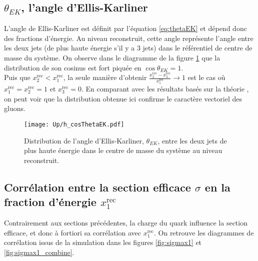 \documentclass[a4paper]{article} %
\numberwithin{equation}{section} %
\theoremstyle{definition}
\theoremstyle{remark}
\theoremstyle{plain}%
\theoremstyle{style_exemple}
\newcommand{\com}[1]{\textcolor{Gray}{(#1)}} %
\begin{document}
\subsection{$\theta_{EK}$, l'angle d'Ellis-Karliner}\label{sec:theta_EK}%

L'angle de Ellis-Karliner est définit par l'équation \eqref{eq:thetaEK} et dépend donc des fractions d'énergie. Au niveau reconstruit, cette angle représente l'angle entre les deux jets (de plus haute énergie s'il y a 3 jets) dans le référentiel de centre de masse du système. On observe dans le diagramme de la figure \ref{fig:thetaEK} que la distribution de son cosinus est fort piquée en $\cos\theta_{EK} = 1$.\\
Puis que $x_2^\text{rec} < x_1^\text{rec} $, la seule manière d'obtenir $\frac{x^\text{rec}_2 - x^\text{rec}_3}{x^\text{rec}_1} \rightarrow 1$ est le cas où $x_1^\text{rec} = x_2^\text{rec} = 1$ et $x_3^\text{rec} = 0$. %
En comparant avec les résultats basés sur la théorie \cite{Cours-QCD}%
, on peut voir que la distribution obtenue ici confirme le caractère vectoriel des gluons.

\begin{figure}[H]
    \centering
    \texttt{[image: Up/h\_cosThetaEK.pdf]}
    \begin{minipage}{12cm}
        \caption{Distribution de l'angle d'Ellis-Karliner, $\theta_{EK}$, entre les deux jets de plus haute énergie dans le centre de masse du système au niveau reconstruit.}
        \label{fig:thetaEK}
    \end{minipage}
\end{figure}

\newpage
\subsection{Corrélation entre la section efficace $\sigma$ en la fraction d'énergie $x^\text{rec}_1$}
Contrairement aux sections précédentes, la charge du quark influence la section efficace, et donc à fortiori sa corrélation avec $x_1^\text{rec}$. On retrouve les diagrammes de corrélation issus de la simulation dans les figures \ref{fig:sigmax1} et \ref{fig:sigmax1_combine}.
\end{document}
